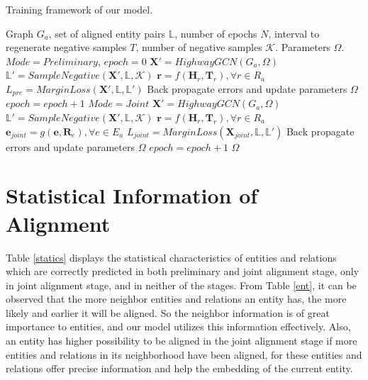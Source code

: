 \documentclass[11pt,a4paper]{article}
\begin{document}
\begin{algorithm}[t!]
\small
	\caption{ Training framework of our model.}
	\label{alg:Framwork}
	\begin{algorithmic}[1]
		\Require
		Graph $G_a$, set of aligned entity pairs $\mathbb{L}$, number of epochs $N$, interval to regenerate negative samples $T$, number of negative samples $\mathcal{K}$.
		\Ensure
		Parameters $\Omega$.
		\State $Mode=Preliminary$, $epoch=0$
		\State $\textbf{X}'=HighwayGCN(G_a,\Omega)$
		\State $\mathbb{L'}=SampleNegative(\textbf{X}',\mathbb{L},\mathcal{K})$
		\EndIf
		\State $\bm{r} = f(\textbf{H}_r, \textbf{T}_r), \forall r \in R_a$
		\State $L_{pre}=MarginLoss(\textbf{X}',\mathbb{L},\mathbb{L'})$
		\State Back propagate errors and update parameters $\Omega$
		\State $epoch=epoch+1$
		\EndWhile
		\State $Mode=Joint$
		\State $\textbf{X}'=HighwayGCN(G_a,\Omega)$
		\State $\mathbb{L'}=SampleNegative(\textbf{X}',\mathbb{L},\mathcal{K})$
		\EndIf
		\State $\bm{r} = f(\textbf{H}_r, \textbf{T}_r), \forall r \in R_a$
		\State $\bm{e}_{joint} =  g(\bm{e}, \bm{R}_e), \forall e \in E_a$
		\State $L_{joint}=MarginLoss(\textbf{X}_{joint},\mathbb{L},\mathbb{L'})$
		\State Back propagate errors and update parameters $\Omega$
		\State $epoch=epoch+1$
		\EndWhile
		\State \Return $\Omega$
	\end{algorithmic}
\end{algorithm}



\section{Statistical Information of Alignment}
Table \ref{statics} displays the statistical characteristics of entities and relations which are correctly predicted in both preliminary and joint alignment stage, only in joint alignment stage, and in neither of the stages. From Table \ref{ent}, it can be observed that the more neighbor entities and relations an entity has, the more likely and earlier it will be aligned. So the neighbor information is of great importance to entities, and our model utilizes this information effectively. Also, an entity has higher possibility to be aligned in the joint alignment stage if more entities and relations in its neighborhood have been aligned, for these entities and relations offer precise information and help the embedding of the current entity.
\end{document}
